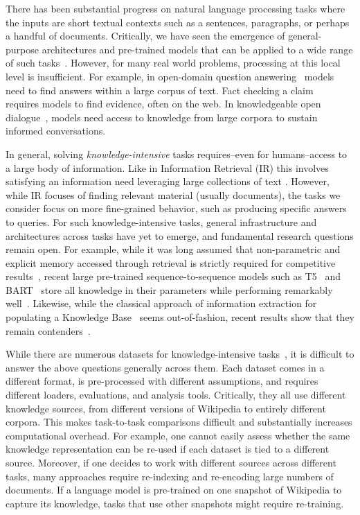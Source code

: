 \documentclass[11pt]{article}
\begin{document}
There has been substantial progress on natural language processing tasks where the inputs are short textual contexts such as a sentences, paragraphs, or perhaps a handful of documents. Critically, we have seen the emergence of general-purpose architectures and pre-trained models that can be applied to a wide range of such tasks~\cite{devlin-etal-2019-bert}.  However, for many real world problems, processing at this local level is insufficient. For example, in open-domain question answering~\cite{chen2017reading} models need to find answers within a large corpus of text. Fact checking a claim~\cite{Thorne18Fever} requires models to find evidence, often on the web. In knowledgeable open dialogue~\cite{dinan2018wizard}, models need access to knowledge from large corpora to sustain informed conversations.

In general, solving \emph{knowledge-intensive} tasks requires--even for humans--access to a large body of information. Like in Information Retrieval (IR) this involves satisfying an information need leveraging large collections of text \cite{manning2008introduction}. However, while IR focuses of finding relevant material (usually documents), the tasks we consider focus on  more fine-grained behavior, such as producing specific answers to queries.
For such knowledge-intensive tasks, general infrastructure and architectures across tasks have yet to emerge, and fundamental research questions remain open. For example, while it was long assumed that non-parametric and explicit memory accessed through retrieval is strictly required for competitive results~\cite{chen2017reading}, recent large pre-trained sequence-to-sequence models such as T5~\cite{2019t5} and BART~\cite{Lewis2019BARTDS} store all knowledge in their parameters while performing remarkably well~\cite{petroni2019language}. 
Likewise, while the classical approach of information extraction for populating a Knowledge Base~\cite[KB, ][]{riedel2013relation,surdeanu2014overview}
seems out-of-fashion, recent results show that they remain contenders~\cite{fan-etal-2019-using,xiong2019pretrained}.

While there are numerous datasets for knowledge-intensive tasks~\citep[e.g.][to name just a few]{Thorne18Fever,dinan2018wizard,kwiatkowski2019natural}, it is difficult to answer the above questions generally across them. Each dataset comes in a different format, is pre-processed with different assumptions, 
and requires different loaders, evaluations, and analysis tools. 
Critically, they all use different knowledge sources, from different versions of Wikipedia to entirely different corpora. This makes task-to-task comparisons difficult and substantially increases computational overhead. For example, one cannot easily assess whether the same knowledge representation can be re-used if each dataset is tied to a different source. Moreover, if one decides to work with different sources across different tasks, many approaches require re-indexing and re-encoding large numbers of documents.
If a language model is pre-trained on one snapshot of Wikipedia to capture its knowledge, tasks that use other snapshots might require re-training.
\end{document}
